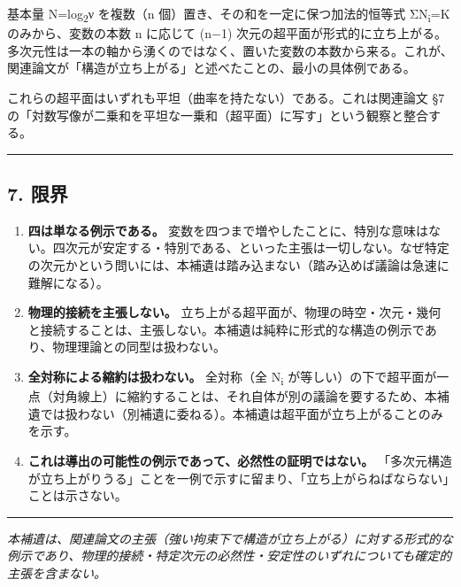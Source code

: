 \documentclass[11pt]{ltjsarticle}
\begin{document}
基本量 N=log\textsubscript{2}ν を複数（n 個）置き、その和を一定に保つ加法的恒等式 ΣN\textsubscript{i}=K
のみから、変数の本数 n に応じて (n−1)
次元の超平面が形式的に立ち上がる。多次元性は一本の軸から湧くのではなく、置いた変数の本数から来る。これが、関連論文が「構造が立ち上がる」と述べたことの、最小の具体例である。

これらの超平面はいずれも平坦（曲率を持たない）である。これは関連論文 §7
の「対数写像が二乗和を平坦な一乗和（超平面）に写す」という観察と整合する。

\begin{center}\rule{0.5\linewidth}{0.5pt}\end{center}

\subsection{7. 限界}\label{ux9650ux754c}

\begin{enumerate}
\def\labelenumi{\arabic{enumi}.}
\item
  \textbf{四は単なる例示である。}
  変数を四つまで増やしたことに、特別な意味はない。四次元が安定する・特別である、といった主張は一切しない。なぜ特定の次元かという問いには、本補遺は踏み込まない（踏み込めば議論は急速に難解になる）。
\item
  \textbf{物理的接続を主張しない。}
  立ち上がる超平面が、物理の時空・次元・幾何と接続することは、主張しない。本補遺は純粋に形式的な構造の例示であり、物理理論との同型は扱わない。
\item
  \textbf{全対称による縮約は扱わない。} 全対称（全 N\textsubscript{i}
  が等しい）の下で超平面が一点（対角線上）に縮約することは、それ自体が別の議論を要するため、本補遺では扱わない（別補遺に委ねる）。本補遺は超平面が立ち上がることのみを示す。
\item
  \textbf{これは導出の可能性の例示であって、必然性の証明ではない。}
  「多次元構造が立ち上がりうる」ことを一例で示すに留まり、「立ち上がらねばならない」ことは示さない。
\end{enumerate}

\begin{center}\rule{0.5\linewidth}{0.5pt}\end{center}

\emph{本補遺は、関連論文の主張（強い拘束下で構造が立ち上がる）に対する形式的な例示であり、物理的接続・特定次元の必然性・安定性のいずれについても確定的主張を含まない。}
\end{document}
